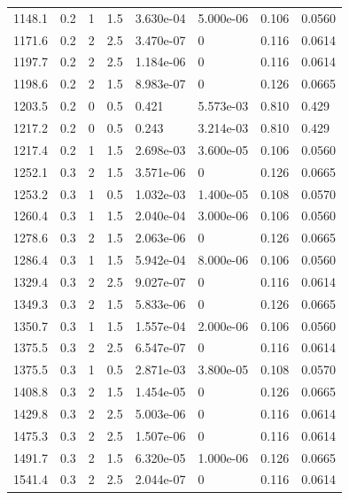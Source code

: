 \documentclass[preview]{standalone}
\begin{document}
{{{\begin{tabular}{L{1.2cm}C{1.2cm} C{0.3cm}C{0.5cm} C{1.4cm}C{1.4cm} C{1.4cm}C{1.4cm}}
  1148.1  &   0.2  & 1     & 1.5 &  3.630e-04  & 5.000e-06  & 0.106 &  0.0560   \\ 
  1171.6  &   0.2  & 2     & 2.5 &  3.470e-07  & 0  & 0.116 &  0.0614   \\ 
  1197.7  &   0.2  & 2     & 2.5 &  1.184e-06  & 0  & 0.116 &  0.0614   \\ 
  1198.6  &   0.2  & 2     & 1.5 &  8.983e-07  & 0  & 0.126 &  0.0665   \\ 
  1203.5  &   0.2  & 0     & 0.5 &  0.421  & 5.573e-03  & 0.810 &  0.429   \\ 
  1217.2  &   0.2  & 0     & 0.5 &  0.243  & 3.214e-03  & 0.810 &  0.429   \\ 
  1217.4  &   0.2  & 1     & 1.5 &  2.698e-03  & 3.600e-05  & 0.106 &  0.0560   \\ 
  1252.1  &   0.3  & 2     & 1.5 &  3.571e-06  & 0  & 0.126 &  0.0665   \\ 
  1253.2  &   0.3  & 1     & 0.5 &  1.032e-03  & 1.400e-05  & 0.108 &  0.0570   \\ 
  1260.4  &   0.3  & 1     & 1.5 &  2.040e-04  & 3.000e-06  & 0.106 &  0.0560   \\ 
  1278.6  &   0.3  & 2     & 1.5 &  2.063e-06  & 0  & 0.126 &  0.0665   \\ 
  1286.4  &   0.3  & 1     & 1.5 &  5.942e-04  & 8.000e-06  & 0.106 &  0.0560   \\ 
  1329.4  &   0.3  & 2     & 2.5 &  9.027e-07  & 0  & 0.116 &  0.0614   \\ 
  1349.3  &   0.3  & 2     & 1.5 &  5.833e-06  & 0  & 0.126 &  0.0665   \\ 
  1350.7  &   0.3  & 1     & 1.5 &  1.557e-04  & 2.000e-06  & 0.106 &  0.0560   \\ 
  1375.5  &   0.3  & 2     & 2.5 &  6.547e-07  & 0  & 0.116 &  0.0614   \\ 
  1375.5  &   0.3  & 1     & 0.5 &  2.871e-03  & 3.800e-05  & 0.108 &  0.0570   \\ 
  1408.8  &   0.3  & 2     & 1.5 &  1.454e-05  & 0  & 0.126 &  0.0665   \\ 
  1429.8  &   0.3  & 2     & 2.5 &  5.003e-06  & 0  & 0.116 &  0.0614   \\ 
  1475.3  &   0.3  & 2     & 2.5 &  1.507e-06  & 0  & 0.116 &  0.0614   \\ 
  1491.7  &   0.3  & 2     & 1.5 &  6.320e-05  & 1.000e-06  & 0.126 &  0.0665   \\ 
  1541.4  &   0.3  & 2     & 2.5 &  2.044e-07  & 0  & 0.116 &  0.0614   \\ 

\end{tabular}}}}
\end{document}
